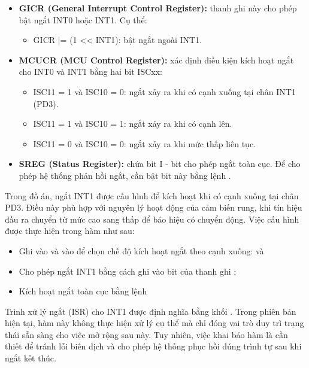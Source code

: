 \documentclass[../DoAn.tex]{subfiles}
\begin{document}
\begin{itemize}
    \item \textbf{GICR (General Interrupt Control Register):} thanh ghi này cho phép bật ngắt INT0 hoặc INT1. Cụ thể:
    \begin{itemize}
        \item GICR |= (1 << INT1): bật ngắt ngoài INT1.
    \end{itemize}

    \item \textbf{MCUCR (MCU Control Register):} xác định điều kiện kích hoạt ngắt cho INT0 và INT1 bằng hai bit ISCxx:
    \begin{itemize}
        \item ISC11 = 1 và ISC10 = 0: ngắt xảy ra khi có cạnh xuống tại chân INT1 (PD3).
        \item ISC11 = 1 và ISC10 = 1: ngắt xảy ra khi có cạnh lên.
        \item ISC11 = 0 và ISC10 = 0: ngắt xảy ra khi mức thấp liên tục.
    \end{itemize}

    \item \textbf{SREG (Status Register):} chứa bit I - bit cho phép ngắt toàn cục. Để cho phép hệ thống phản hồi ngắt, cần bật bit này bằng lệnh .
\end{itemize}

Trong đồ án, ngắt INT1 được cấu hình để kích hoạt khi có cạnh xuống tại chân PD3. Điều này phù hợp với nguyên lý hoạt động của cảm biến rung, khi tín hiệu đầu ra chuyển từ mức cao sang thấp để báo hiệu có chuyển động. Việc cấu hình được thực hiện trong hàm  như sau:

\begin{itemize}
    \item Ghi  vào  và  vào  để chọn chế độ kích hoạt ngắt theo cạnh xuống:  và 
    \item Cho phép ngắt INT1 bằng cách ghi  vào bit  của thanh ghi : 
    \item Kích hoạt ngắt toàn cục bằng lệnh 
\end{itemize}

Trình xử lý ngắt (ISR) cho INT1 được định nghĩa bằng khối . Trong phiên bản hiện tại, hàm này không thực hiện xử lý cụ thể mà chỉ đóng vai trò duy trì trạng thái sẵn sàng cho việc mở rộng sau này. Tuy nhiên, việc khai báo hàm là cần thiết để tránh lỗi biên dịch và cho phép hệ thống phục hồi đúng trình tự sau khi ngắt kết thúc.
\end{document}
